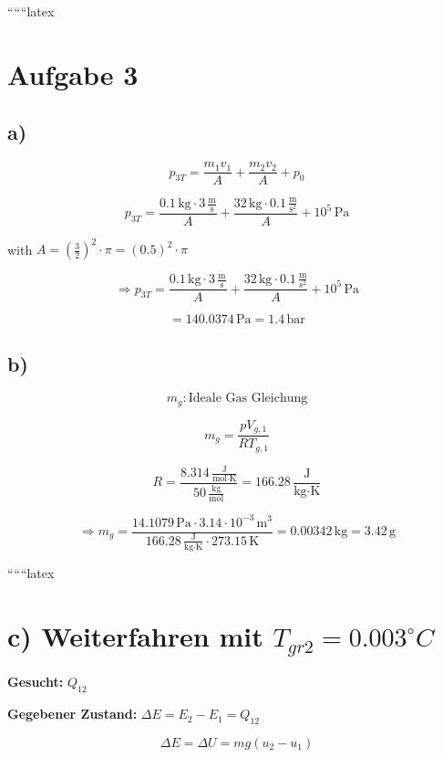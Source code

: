 
``````latex


\section*{Aufgabe 3}

\subsection*{a)}

\[
p_{3T} = \frac{m_{1}v_{1}}{A} + \frac{m_{2}v_{2}}{A} + p_{0}
\]

\[
p_{3T} = \frac{0.1 \, \text{kg} \cdot 3 \, \frac{\text{m}}{\text{s}}}{A} + \frac{32 \, \text{kg} \cdot 0.1 \, \frac{\text{m}}{\text{s}^2}}{A} + 10^5 \, \text{Pa}
\]

with \( A = \left(\frac{3}{2}\right)^2 \cdot \pi = (0.5)^2 \cdot \pi \)

\[
\Rightarrow p_{3T} = \frac{0.1 \, \text{kg} \cdot 3 \, \frac{\text{m}}{\text{s}}}{A} + \frac{32 \, \text{kg} \cdot 0.1 \, \frac{\text{m}}{\text{s}^2}}{A} + 10^5 \, \text{Pa}
\]

\[
= 140.0374 \, \text{Pa} = 1.4 \, \text{bar}
\]

\subsection*{b)}

\[
m_g: \text{Ideale Gas Gleichung}
\]

\[
m_g = \frac{pV_{g,1}}{R T_{g,1}}
\]

\[
R = \frac{8.314 \, \frac{\text{J}}{\text{mol} \cdot \text{K}}}{50 \, \frac{\text{kg}}{\text{mol}}} = 166.28 \, \frac{\text{J}}{\text{kg} \cdot \text{K}}
\]

\[
\Rightarrow m_g = \frac{14.1079 \, \text{Pa} \cdot 3.14 \cdot 10^{-3} \, \text{m}^3}{166.28 \, \frac{\text{J}}{\text{kg} \cdot \text{K}} \cdot 273.15 \, \text{K}} = 0.00342 \, \text{kg} = 3.42 \, \text{g}
\]

``````latex


\section*{c) Weiterfahren mit $T_{gr2} = 0.003^\circ C$}

\textbf{Gesucht:} $Q_{12}$

\textbf{Gegebener Zustand:} $\Delta E = E_2 - E_1 = Q_{12}$

\[
\Delta E = \Delta U = m g (u_2 - u_1)
\]

